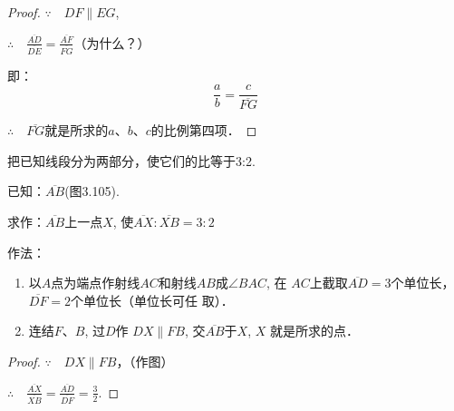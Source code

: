 \begin{proof}
$\because\quad DF\parallel EG$,

$\therefore\quad \frac{\overline{AD}}{\overline{DE}}=\frac{\overline{AF}}{\overline{FG}}$（为什么？）

即：
\[\frac{a}{b}=\frac{c}{\overline{FG}}\]

$\therefore\quad \overline{FG}$就是所求的$a$、$b$、$c$的比例第四项．

    
\end{proof}

\begin{example}
   把已知线段分为两部分，使它们的比等于3:2.

已知：$\overline{AB}$(图3.105).

求作：$\overline{AB}$上一点$X$, 使$\overline{AX}:\overline{XB}=3:2$

作法：
\begin{enumerate}
    \item 以$A$点为端点作射线$AC$和射线$AB$成$\angle BAC$, 在
    $AC$上截取$\overline{AD}=3$个单位长，$\overline{DF}=2$个单位长（单位长可任
    取）．
\item 连结$F$、$B$, 过$D$作
    $DX\parallel FB$, 交$\overline{AB}$于$X$, $X$
    就是所求的点．
\end{enumerate}
\end{example}

\begin{proof}
$\because\quad DX\parallel FB$，（作图）

$\therefore\quad \frac{\overline{AX}}{\overline{XB}}=\frac{\overline{AD}}{\overline{DF}}=\frac{3}{2}$.
\end{proof}

